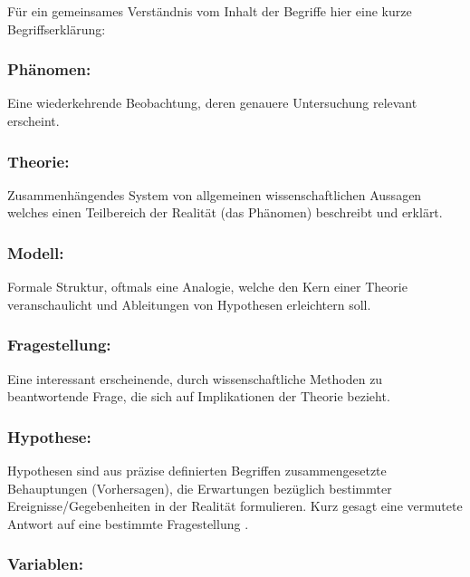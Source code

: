 \documentclass[
]{book}
\begin{document}
Für ein gemeinsames Verständnis vom Inhalt der Begriffe hier eine kurze Begriffserklärung:

\hypertarget{phuxe4nomen}{%
\subsubsection{Phänomen:}\label{phuxe4nomen}}

Eine wiederkehrende Beobachtung, deren genauere Untersuchung relevant erscheint.

\hypertarget{theorie}{%
\subsubsection{Theorie:}\label{theorie}}

Zusammenhängendes System von allgemeinen wissenschaftlichen Aussagen
welches einen Teilbereich der Realität (das Phänomen) beschreibt und erklärt.

\hypertarget{modell}{%
\subsubsection{Modell:}\label{modell}}

Formale Struktur, oftmals eine Analogie, welche den Kern einer Theorie
veranschaulicht und Ableitungen von Hypothesen erleichtern soll.

\hypertarget{fragestellung}{%
\subsubsection{Fragestellung:}\label{fragestellung}}

Eine interessant erscheinende, durch wissenschaftliche Methoden zu beantwortende Frage, die sich auf Implikationen der Theorie bezieht.

\hypertarget{hypothese}{%
\subsubsection{Hypothese:}\label{hypothese}}

Hypothesen sind aus präzise definierten Begriffen zusammengesetzte
Behauptungen (Vorhersagen), die Erwartungen bezüglich bestimmter
Ereignisse/Gegebenheiten in der Realität formulieren. Kurz gesagt eine vermutete Antwort auf eine bestimmte Fragestellung .

\hypertarget{variablen}{%
\subsubsection{Variablen:}\label{variablen}}
\end{document}
